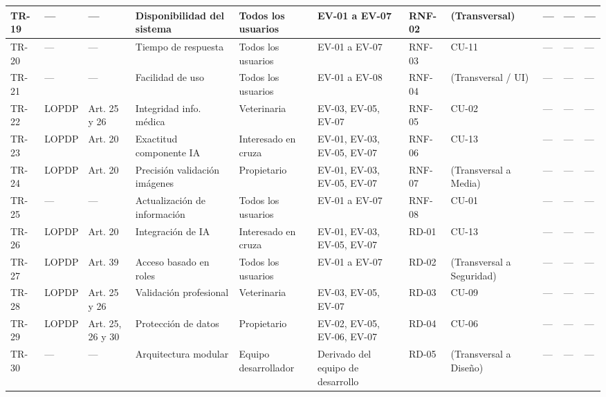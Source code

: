 \documentclass[journal,onecolumn]{IEEEtran}
\begin{document}
\begin{landscape}
\begin{longtable}{@{}p{0.8cm} p{1.3cm} p{1.5cm} p{2.2cm} p{1.5cm} p{1.8cm} p{1.6cm} p{1.3cm} p{1.3cm} p{1.3cm} p{1.5cm}@{}}
			TR-19 & --- & --- & Disponibilidad del sistema & Todos los usuarios & EV-01 a EV-07 & RNF-02 & (Transversal) & --- & --- & --- \\ \midrule
			
			TR-20 & --- & --- & Tiempo de respuesta & Todos los usuarios & EV-01 a EV-07 & RNF-03 & CU-11 & --- & --- & --- \\ \midrule
			
			TR-21 & --- & --- & Facilidad de uso & Todos los usuarios & EV-01 a EV-08 & RNF-04 & (Transversal / UI) & --- & --- & --- \\ \midrule
			
			TR-22 & LOPDP & Art. 25 y 26 & Integridad info. médica & Veterinaria & EV-03, EV-05, EV-07 & RNF-05 & CU-02 & --- & --- & --- \\ \midrule
			
			TR-23 & LOPDP & Art. 20 & Exactitud componente IA & Interesado en cruza & EV-01, EV-03, EV-05, EV-07 & RNF-06 & CU-13 & --- & --- & --- \\ \midrule
			
			TR-24 & LOPDP & Art. 20 & Precisión validación imágenes & Propietario & EV-01, EV-03, EV-05, EV-07 & RNF-07 & (Transversal a Media) & --- & --- & --- \\ \midrule
			
			TR-25 & --- & --- & Actualización de información & Todos los usuarios & EV-01 a EV-07 & RNF-08 & CU-01 & --- & --- & --- \\ \midrule
			
			TR-26 & LOPDP & Art. 20 & Integración de IA & Interesado en cruza & EV-01, EV-03, EV-05, EV-07 & RD-01 & CU-13 & --- & --- & --- \\ \midrule
			
			TR-27 & LOPDP & Art. 39 & Acceso basado en roles & Todos los usuarios & EV-01 a EV-07 & RD-02 & (Transversal a Seguridad) & --- & --- & --- \\ \midrule
			
			TR-28 & LOPDP & Art. 25 y 26 & Validación profesional & Veterinaria & EV-03, EV-05, EV-07 & RD-03 & CU-09 & --- & --- & --- \\ \midrule
			
			TR-29 & LOPDP & Art. 25, 26 y 30 & Protección de datos & Propietario & EV-02, EV-05, EV-06, EV-07 & RD-04 & CU-06 & --- & --- & --- \\ \midrule
			
			TR-30 & --- & --- & Arquitectura modular & Equipo desarrollador & Derivado del equipo de desarrollo & RD-05 & (Transversal a Diseño) & --- & --- & --- \\ \midrule
			

\end{longtable}
\end{landscape}
\end{document}
